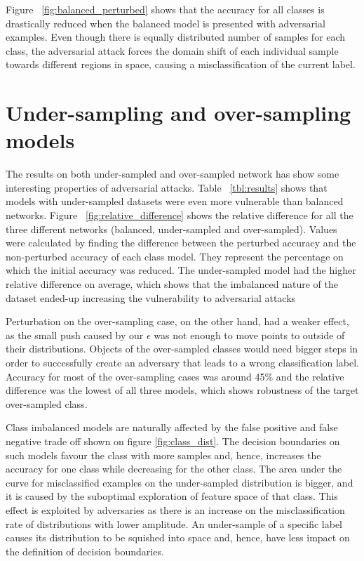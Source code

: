 Figure ~\ref{fig:balanced_perturbed} shows that the accuracy for all classes is drastically reduced when the balanced model is presented with adversarial examples. Even though there is equally distributed number of samples for each class, the adversarial attack forces the domain shift of each individual sample towards different regions in space, causing a misclassification of the current label.

\section{Under-sampling and over-sampling models}

The results on both under-sampled and over-sampled network has show some interesting properties of adversarial attacks. 
Table ~\ref{tbl:results} shows that models with under-sampled datasets were even more vulnerable than balanced networks. Figure ~\ref{fig:relative_difference} shows the relative difference for all the three different networks (balanced, under-sampled and over-sampled). Values were calculated by finding the difference between the perturbed accuracy and the non-perturbed accuracy of each class model. They represent the percentage on which the initial accuracy was reduced. The under-sampled model had the higher relative difference on average, which shows that the imbalanced nature of the dataset ended-up increasing the vulnerability to adversarial attacks

Perturbation on the over-sampling case, on the other hand, had a weaker effect, as the small push caused by our $\epsilon$ was not enough to move points to outside of their distributions. Objects of the over-sampled classes would need bigger steps in order to successfully create an adversary that leads to a wrong classification label. Accuracy for
most of the over-sampling cases was around 45\% and the relative difference was the lowest of all three models, which shows robustness of the target over-sampled class.

Class imbalanced models are naturally affected by the false positive and false negative trade off shown on figure \ref{fig:class_dist}. The decision boundaries on such models favour the class with more samples and, hence, increases the accuracy for one class while decreasing for the other class. The area under the curve for misclassified examples on the under-sampled distribution is bigger, and it is caused by the suboptimal exploration of feature space of that class. This effect is exploited by adversaries as there is an increase on the misclassification rate of distributions with lower amplitude. An under-sample of a specific label causes its distribution to be squished into space and, hence, have less impact on the definition of decision boundaries.

